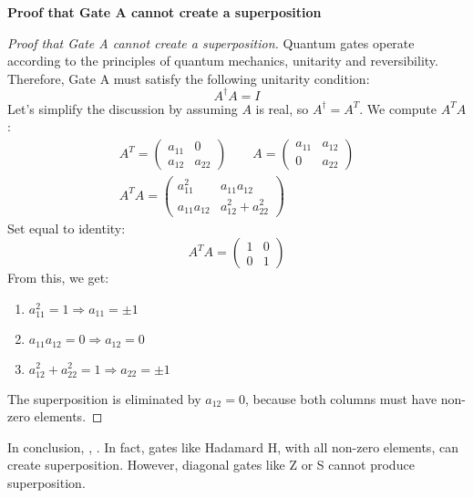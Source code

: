 \highspace
\begin{flushleft}
    \textcolor{Green3}{\textbf{Proof that Gate A cannot create a superposition}}
\end{flushleft}
\begin{proof}[Proof that Gate A cannot create a superposition]
    Quantum gates operate according to the principles of quantum mechanics, unitarity and reversibility. Therefore, Gate A must satisfy the following unitarity condition:
    \begin{equation*}
        A^{\dagger} A = I
    \end{equation*}
    Let's simplify the discussion by assuming $A$ is real, so $A^{\dagger} = A^{T}$. We compute $A^{T}A$:
    \begin{gather*}
        A^{T} =
        \begin{pmatrix}
            a_{11} & 0      \\
            a_{12} & a_{22}
        \end{pmatrix}
        \hspace{2em}
        A =
        \begin{pmatrix}
            a_{11}  & a_{12} \\
            0       & a_{22}
        \end{pmatrix}
        \\
        A^{T} A =
        \begin{pmatrix}
            a_{11}^{2}      & a_{11}a_{12}           \\
            a_{11}a_{12}    & a_{12}^{2} + a_{22}^{2}
        \end{pmatrix}
    \end{gather*}
    Set equal to identity:
    \begin{equation*}
        A^T A =
        \begin{pmatrix}
            1 & 0 \\
            0 & 1
        \end{pmatrix}
    \end{equation*}
    From this, we get:
    \begin{enumerate}
        \item $a_{11}^{2} = 1 \Rightarrow a_{11} = \pm 1$
        \item $a_{11}a_{12} = 0 \Rightarrow a_{12} = 0$
        \item $a_{12}^{2} + a_{22}^{2} = 1 \Rightarrow a_{22} = \pm 1 $
    \end{enumerate}
    The superposition is eliminated by $a_{12} = 0$, because both columns must have non-zero elements.
\end{proof}

\noindent
In conclusion, , . In fact, gates like Hadamard H, with all non-zero elements, can create superposition. However, diagonal gates like Z or S cannot produce superposition.
